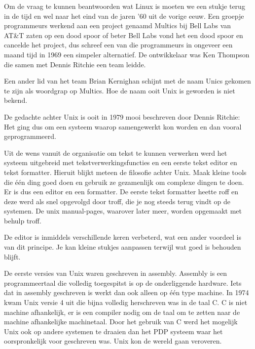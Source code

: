 Om de vraag te kunnen beantwoorden wat Linux is moeten we een stukje terug in de tijd en wel naar het eind van de jaren '60 uit de vorige eeuw. Een groepje programmeurs werkend aan een project genaamd Multics bij Bell Labs van AT\&T zaten op een dood spoor of beter Bell Labs vond het een dood spoor en cancelde het project, dus schreef een van die programmeurs in ongeveer een maand tijd in 1969 een simpeler alternatief. De ontwikkelaar was Ken Thompson die samen met Dennis Ritchie een team leidde.\par

Een ander lid van het team Brian Kernighan schijnt met de naam Unics gekomen te zijn als woordgrap op Multics. Hoe de naam ooit Unix is geworden is niet bekend.\par

De gedachte achter Unix is ooit in 1979 mooi beschreven door Dennis Ritchie:
Het ging dus om een systeem waarop samengewerkt kon worden en dan vooral geprogrammeerd.\par

Uit de wens vanuit de organisatie om tekst te kunnen verwerken werd het systeem uitgebreid met tekstverwerkingsfuncties
en een eerste tekst editor en tekst formatter. Hieruit blijkt meteen de filosofie achter Unix. Maak kleine tools die
\'e\'en ding goed doen en gebruik ze gezamenlijk om complexe dingen te doen. Er is dus een editor en een formatter. De
eerste tekst formatter heette roff en deze werd als snel opgevolgd door troff, die je nog steeds terug vindt op de
systemen. De unix manual-pages, waarover later meer, worden opgemaakt met behulp troff.\par

De editor is inmiddels verschillende keren verbeterd, wat een ander voordeel is van dit  principe. Je kan kleine stukjes aanpassen terwijl wat goed is behouden blijft.

De eerste versies van Unix waren geschreven in assembly. Assembly is een programmeertaal die volledig toegespitst is op de onderliggende hardware. Iets dat in assembly geschreven is werkt dan ook alleen op \'e\'en type machine. In 1974 kwam Unix versie 4 uit die bijna volledig herschreven was in de
taal C. C is niet machine afhankelijk, er is een compiler nodig om de taal om te zetten naar de machine afhankelijke machinetaal. Door het gebruik van C werd het mogelijk Unix ook op andere systemen te draaien dan het PDP systeem
waar het oorspronkelijk voor geschreven was. Unix kon de wereld gaan veroveren.\par


